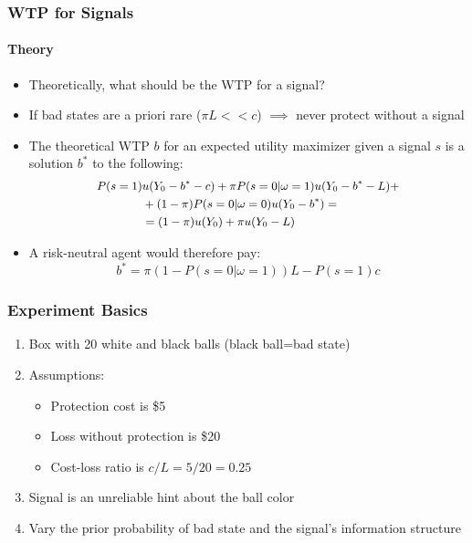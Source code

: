 \documentclass[11pt,hyperref={bookmarks=false}]{beamer}
\begin{document}
\begin{frame}
\frametitle{WTP for Signals}
\framesubtitle{Theory}

\begin{itemize}
	\item Theoretically, what should be the WTP for a signal?
	\item If bad states are a priori rare ($\pi L<<c$) $\implies$ never protect without a signal
	\item The theoretical WTP $b$ for an expected utility maximizer given a signal $s$ is a solution $b^*$ to the following:
	\[
	\small
	\begin{split}
		P(s=1) &u(Y_0-b^*-c) + \pi P(s=0|\omega=1)u(Y_0-b^*-L)+\\ 
		&+(1-\pi)P(s=0|\omega=0)u(Y_0-b^*) =\\
		&=(1-\pi)u(Y_0)+\pi u(Y_0-L)
	\end{split}
	\]
	\normalsize
	\item A risk-neutral agent would therefore pay:
		\[b^*=\pi(1-P(s=0|\omega=1))L-P(s=1)c\]
\end{itemize}
\end{frame}

\begin{frame}
\frametitle{Experiment Basics}
\begin{enumerate}
\item Box with 20 white and black balls (black ball=bad state)
\item Assumptions:
\begin{itemize}
\item Protection cost is \$5
\item Loss without protection is \$20
\item Cost-loss ratio is $c/L=5/20=0.25$
\end{itemize}
\item Signal is an unreliable hint about the ball color
\item Vary the prior probability of bad state and the signal's information structure
\end{enumerate}
\end{frame}
\end{document}
